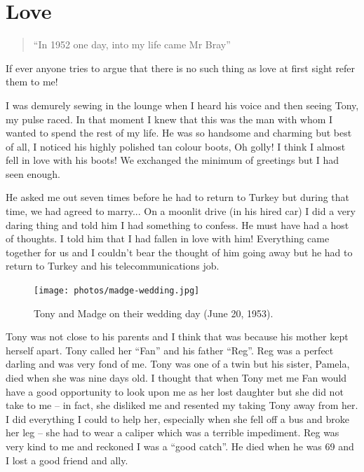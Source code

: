 \enlargethispage{\baselineskip}

\clearpage
\thispagestyle{empty}


\chapter{Love}

\begin{verse}
``In 1952 one day, into my life came Mr Bray''
\end{verse}

If ever anyone tries to argue that there is no such thing as love at
first sight refer them to me!

I was demurely sewing in the lounge when I heard his voice and then
seeing Tony, my pulse raced. In that moment I knew that this was the
man with whom I wanted to spend the rest of my life. He was so
handsome and charming but best of all, I noticed his highly polished
tan colour boots, Oh golly! I think I almost fell in love with his
boots! We exchanged the minimum of greetings but I had seen enough.

He asked me out seven times before he had to return to Turkey but
during that time, we had agreed to marry... On a moonlit drive (in his
hired car) I did a very daring thing and told him I had something to
confess. He must have had a host of thoughts. I told him that I had
fallen in love with him! Everything came together for us and I
couldn't bear the thought of him going away but he had to return to
Turkey and his telecommunications job.

\begin{figure}
  \centering
  \texttt{[image: photos/madge-wedding.jpg]}
  \caption{Tony and Madge on their wedding day (June 20, 1953).}
  \label{madge-wedding}
\end{figure}

Tony was not close to his parents and I think that was because his
mother kept herself apart. Tony called her ``Fan'' and his father
``Reg''. Reg was a perfect darling and was very fond of me. Tony was
one of a twin but his sister, Pamela, died when she was nine days
old. I thought that when Tony met me Fan would have a good opportunity
to look upon me as her lost daughter but she did not take to me -- in
fact, she disliked me and resented my taking Tony away from her. I did
everything I could to help her, especially when she fell off a bus and
broke her leg -- she had to wear a caliper which was a terrible
impediment. Reg was very kind to me and reckoned I was a ``good
catch''. He died when he was 69 and I lost a good friend and ally.

